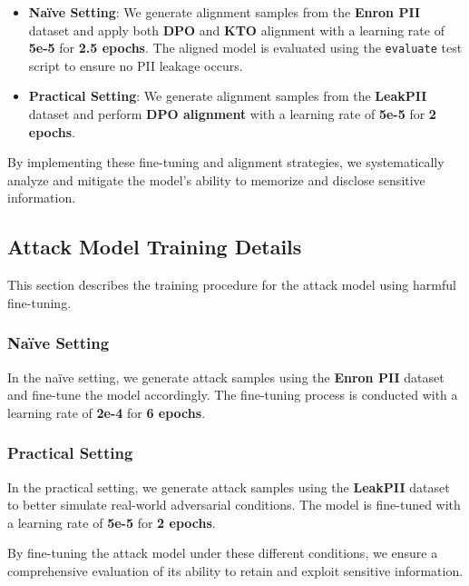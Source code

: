 \begin{itemize}  
    \item \textbf{Naïve Setting}: We generate alignment samples from the \textbf{Enron PII} dataset and apply both \textbf{DPO} and \textbf{KTO} alignment with a learning rate of \textbf{5e-5} for \textbf{2.5 epochs}. The aligned model is evaluated using the \texttt{evaluate} test script to ensure no PII leakage occurs.  
    \item \textbf{Practical Setting}: We generate alignment samples from the \textbf{LeakPII} dataset and perform \textbf{DPO alignment} with a learning rate of \textbf{5e-5} for \textbf{2 epochs}.  
\end{itemize}  

By implementing these fine-tuning and alignment strategies, we systematically analyze and mitigate the model’s ability to memorize and disclose sensitive information.  





\subsection{Attack Model Training Details}  
\label{app:attack_model_training}  

This section describes the training procedure for the attack model using harmful fine-tuning. 
\subsubsection{Naïve Setting}  
In the naïve setting, we generate attack samples using the \textbf{Enron PII} dataset and fine-tune the model accordingly. The fine-tuning process is conducted with a learning rate of \textbf{2e-4} for \textbf{6 epochs}.  

\subsubsection{Practical Setting}  
In the practical setting, we generate attack samples using the \textbf{LeakPII} dataset to better simulate real-world adversarial conditions. The model is fine-tuned with a learning rate of \textbf{5e-5} for \textbf{2 epochs}.  

By fine-tuning the attack model under these different conditions, we ensure a comprehensive evaluation of its ability to retain and exploit sensitive information.  
